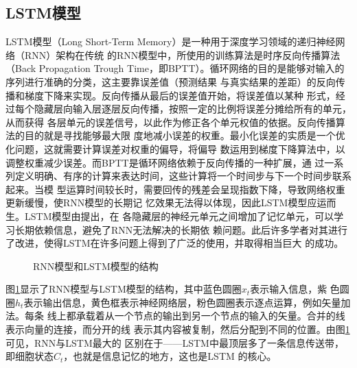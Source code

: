 \documentclass[lang=cn,11pt,a4paper,cite=authoryear]{elegantpaper}
\begin{document}
\subsection{LSTM模型}
LSTM模型（Long Short-Term Memory）是一种用于深度学习领域的递归神经网络（RNN）架构在传统
的RNN模型中，所使用的训练算法是时序反向传播算法（Back Propagation Trough 
Time，即BPTT）。循环网络的目的是能够对输入的序列进行准确的分类，这主要靠误差值（预测结果
与真实结果的差距）的反向传播和梯度下降来实现。反向传播从最后的误差值开始，将误差值以某种
形式，经过每个隐藏层向输入层逐层反向传播，按照一定的比例将误差分摊给所有的单元，从而获得
各层单元的误差信号，以此作为修正各个单元权值的依据。反向传播算法的目的就是寻找能够最大限
度地减小误差的权重。最小化误差的实质是一个优化问题，这就需要计算误差对权重的偏导，将偏导
数运用到梯度下降算法中，以调整权重减少误差。而BPTT是循环网络依赖于反向传播的一种扩展，通
过一系列定义明确、有序的计算来表达时间，这些计算将一个时间步与下一个时间步联系起来。当模
型运算时间较长时，需要回传的残差会呈现指数下降，导致网络权重更新缓慢，使RNN模型的长期记
忆效果无法得以体现，因此LSTM模型应运而生。LSTM模型由\cite{hochreiter1997lstm}提出，在
各隐藏层的神经元单元之间增加了记忆单元，可以学习长期依赖信息，避免了RNN无法解决的长期依
赖问题。此后许多学者对其进行了改进，使得LSTM在许多问题上得到了广泛的使用，并取得相当巨大
的成功\citep{gers2000learning, graves2005bidirectional, graves2005framewise, 
schmidhuber2007training, bayer2009evolving, schaul2010pybrain, 
graves2013hybrid, bayer2014Learning}。

\begin{figure}[htp]
	\centering
    \caption{RNN模型和LSTM模型的结构}
	\label{fig:structure}
\end{figure}

图\ref{fig:structure}显示了RNN模型与LSTM模型的结构，其中蓝色圆圈$x_t$表示输入信息，紫
色圆圈$h_t$表示输出信息，黄色框表示神经网络层，粉色圆圈表示逐点运算，例如矢量加法。每条
线上都承载着从一个节点的输出到另一个节点的输入的矢量。合并的线表示向量的连接，而分开的线
表示其内容被复制，然后分配到不同的位置。由图\ref{fig:structure}可见，RNN与LSTM最大的
区别在于——LSTM中最顶层多了一条信息传送带，即细胞状态$C_t$，也就是信息记忆的地方，这也是LSTM
的核心。
\end{document}
